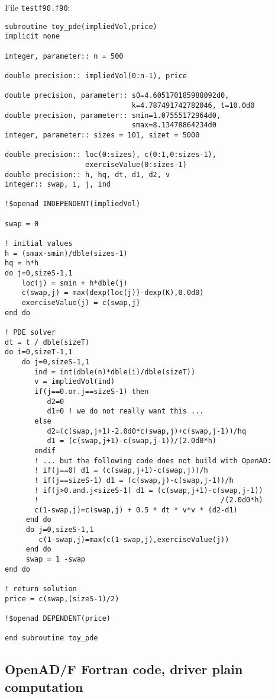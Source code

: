 \documentclass{amsart}
\theoremstyle{plain}
\numberwithin{equation}{section}
\begin{document}
File \verb+testf90.f90+:

\begin{verbatim}
subroutine toy_pde(impliedVol,price)
implicit none

integer, parameter:: n = 500

double precision:: impliedVol(0:n-1), price

double precision, parameter:: s0=4.605170185988092d0,
                              k=4.787491742782046, t=10.0d0
double precision, parameter:: smin=1.07555172964d0, 
                              smax=8.13478864234d0
integer, parameter:: sizes = 101, sizet = 5000

double precision:: loc(0:sizes), c(0:1,0:sizes-1), 
                   exerciseValue(0:sizes-1)
double precision:: h, hq, dt, d1, d2, v
integer:: swap, i, j, ind

!$openad INDEPENDENT(impliedVol)

swap = 0

! initial values
h = (smax-smin)/dble(sizes-1)
hq = h*h
do j=0,sizeS-1,1
    loc(j) = smin + h*dble(j)
    c(swap,j) = max(dexp(loc(j))-dexp(K),0.0d0)
    exerciseValue(j) = c(swap,j)
end do

! PDE solver
dt = t / dble(sizeT)
do i=0,sizeT-1,1
    do j=0,sizeS-1,1
       ind = int(dble(n)*dble(i)/dble(sizeT))
       v = impliedVol(ind)
       if(j==0.or.j==sizeS-1) then
          d2=0
          d1=0 ! we do not really want this ...
       else
          d2=(c(swap,j+1)-2.0d0*c(swap,j)+c(swap,j-1))/hq
          d1 = (c(swap,j+1)-c(swap,j-1))/(2.0d0*h)
       endif
       ! ... but the following code does not build with OpenAD:
       ! if(j==0) d1 = (c(swap,j+1)-c(swap,j))/h
       ! if(j==sizeS-1) d1 = (c(swap,j)-c(swap,j-1))/h
       ! if(j>0.and.j<sizeS-1) d1 = (c(swap,j+1)-c(swap,j-1))
       !                                           /(2.0d0*h)
       c(1-swap,j)=c(swap,j) + 0.5 * dt * v*v * (d2-d1)
     end do
     do j=0,sizeS-1,1
        c(1-swap,j)=max(c(1-swap,j),exerciseValue(j))
     end do
     swap = 1 -swap
end do
  
! return solution
price = c(swap,(sizeS-1)/2)

!$openad DEPENDENT(price)

end subroutine toy_pde
\end{verbatim}

\subsection{OpenAD/F Fortran code, driver plain computation}
\end{document}
